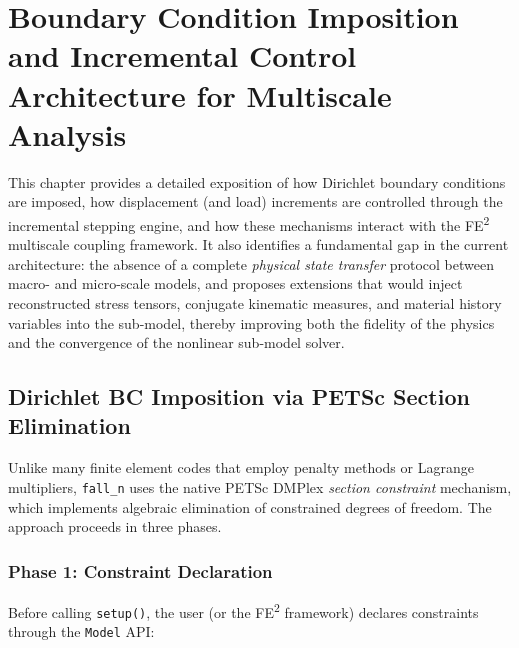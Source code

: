 \chapter{Boundary Condition Imposition and Incremental Control
         Architecture for Multiscale Analysis}
\label{ch:bc-incremental-multiscale}

This chapter provides a detailed exposition of how Dirichlet boundary
conditions are imposed, how displacement (and load) increments are
controlled through the incremental stepping engine, and how these
mechanisms interact with the FE\textsuperscript{2} multiscale coupling
framework.  It also identifies a fundamental gap in the current
architecture: the absence of a complete \emph{physical state transfer}
protocol between macro- and micro-scale models, and proposes extensions
that would inject reconstructed stress tensors, conjugate kinematic
measures, and material history variables into the sub-model, thereby
improving both the fidelity of the physics and the convergence of the
nonlinear sub-model solver.


\section{Dirichlet BC Imposition via PETSc Section Elimination}
\label{sec:dirichlet-imposition}

Unlike many finite element codes that employ penalty methods or
Lagrange multipliers, \texttt{fall\_n} uses the native PETSc DMPlex
\emph{section constraint} mechanism, which implements algebraic
elimination of constrained degrees of freedom.  The approach proceeds
in three phases.

\subsection{Phase 1: Constraint Declaration}
\label{ssec:bc-declaration}

Before calling \verb|setup()|, the user (or the FE\textsuperscript{2}
framework) declares constraints through the \texttt{Model} API:

